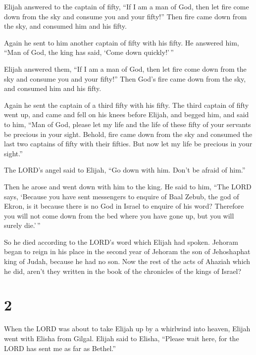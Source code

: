 Elijah answered to the captain of fifty, ``If I am a man
of God, then let fire come down from the sky and consume you and your
fifty!'' Then fire came down from the sky, and consumed him and his
fifty.

 Again he sent to him another captain of fifty with his
fifty. He answered him, ``Man of God, the king has said, `Come down
quickly!'\,''

 Elijah answered them, ``If I am a man of God, then let
fire come down from the sky and consume you and your fifty!'' Then God's
fire came down from the sky, and consumed him and his fifty.

 Again he sent the captain of a third fifty with his
fifty. The third captain of fifty went up, and came and fell on his
knees before Elijah, and begged him, and said to him, ``Man of God,
please let my life and the life of these fifty of your servants be
precious in your sight.  Behold, fire came down from the
sky and consumed the last two captains of fifty with their fifties. But
now let my life be precious in your sight.''

 The LORD's angel said to Elijah, ``Go down with him.
Don't be afraid of him.''

Then he arose and went down with him to the king.  He
said to him, ``The LORD says, `Because you have sent messengers to
enquire of Baal Zebub, the god of Ekron, is it because there is no God
in Israel to enquire of his word? Therefore you will not come down from
the bed where you have gone up, but you will surely die.'\,''

 So he died according to the LORD's word which Elijah had
spoken. Jehoram began to reign in his place in the second year of
Jehoram the son of Jehoshaphat king of Judah, because he had no son.
 Now the rest of the acts of Ahaziah which he did, aren't
they written in the book of the chronicles of the kings of Israel?

\hypertarget{section-1}{%
\section{2}\label{section-1}}

 When the LORD was about to take Elijah up by a whirlwind
into heaven, Elijah went with Elisha from Gilgal.  Elijah
said to Elisha, ``Please wait here, for the LORD has sent me as far as
Bethel.''

